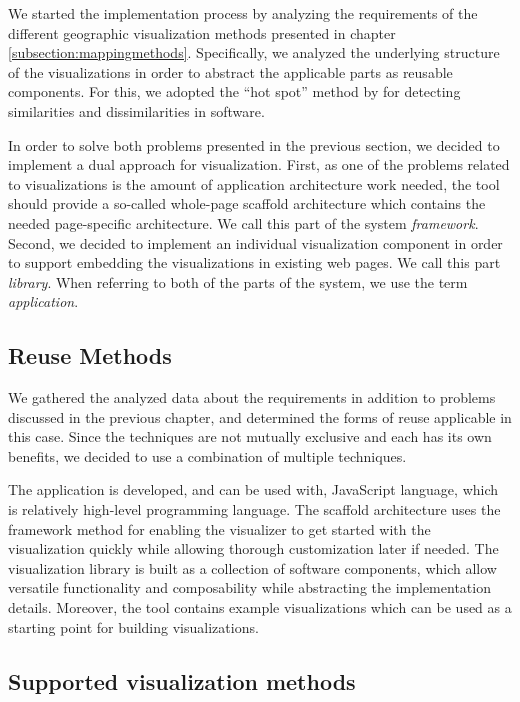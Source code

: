 We started the implementation process by analyzing the requirements of the different geographic visualization methods presented in chapter \ref{subsection:mappingmethods}. Specifically, we analyzed the underlying structure of the visualizations in order to abstract the applicable parts as reusable components. For this, we adopted the ``hot spot'' method by \citet{schmid_systematic_1997} for detecting similarities and dissimilarities in software.

In order to solve both problems presented in the previous section, we decided to implement a dual approach for visualization. First, as one of the problems related to visualizations is the amount of application architecture work needed, the tool should provide a so-called whole-page scaffold architecture \citep{jazayeri_trends_2007} which contains the needed page-specific architecture. We call this part of the system \emph{framework}. Second, we decided to implement an individual visualization component in order to support embedding the visualizations in existing web pages. We call this part \emph{library}. When referring to both of the parts of the system, we use the term \emph{application}.

\subsection{Reuse Methods}

We gathered the analyzed data about the requirements in addition to problems discussed in the previous chapter, and determined the forms of reuse applicable in this case. Since the techniques are not mutually exclusive and each has its own benefits, we decided to use a combination of multiple techniques. 

The application is developed, and can be used with, JavaScript language, which is relatively high-level programming language. The scaffold architecture uses the framework method for enabling the visualizer to get started with the visualization quickly while allowing thorough customization later if needed. The visualization library is built as a collection of software components, which allow versatile functionality and composability while abstracting the implementation details. Moreover, the tool contains example visualizations which can be used as a starting point for building visualizations.


\subsection{Supported visualization methods}
\label{subsection:supportedvisualizationmethods}

